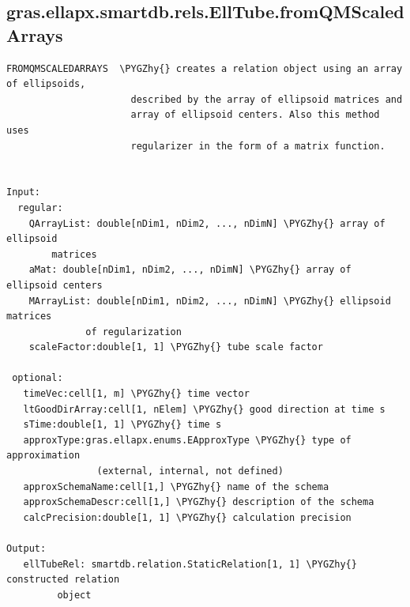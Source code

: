 \documentclass[letterpaper,10pt,english]{sphinxmanual}
\def\PYGZhy{\char`\-}
\begin{document}
\subsection{gras.ellapx.smartdb.rels.EllTube.fromQMScaledArrays}
\label{chap_functions:gras-ellapx-smartdb-rels-elltube-fromqmscaledarrays}
\begin{Verbatim}[commandchars=\\\{\}]
FROMQMSCALEDARRAYS  \PYGZhy{} creates a relation object using an array of ellipsoids,
                      described by the array of ellipsoid matrices and
                      array of ellipsoid centers. Also this method uses
                      regularizer in the form of a matrix function.


Input:
  regular:
    QArrayList: double[nDim1, nDim2, ..., nDimN] \PYGZhy{} array of ellipsoid
        matrices
    aMat: double[nDim1, nDim2, ..., nDimN] \PYGZhy{} array of ellipsoid centers
    MArrayList: double[nDim1, nDim2, ..., nDimN] \PYGZhy{} ellipsoid matrices
              of regularization
    scaleFactor:double[1, 1] \PYGZhy{} tube scale factor

 optional:
   timeVec:cell[1, m] \PYGZhy{} time vector
   ltGoodDirArray:cell[1, nElem] \PYGZhy{} good direction at time s
   sTime:double[1, 1] \PYGZhy{} time s
   approxType:gras.ellapx.enums.EApproxType \PYGZhy{} type of approximation
                (external, internal, not defined)
   approxSchemaName:cell[1,] \PYGZhy{} name of the schema
   approxSchemaDescr:cell[1,] \PYGZhy{} description of the schema
   calcPrecision:double[1, 1] \PYGZhy{} calculation precision

Output:
   ellTubeRel: smartdb.relation.StaticRelation[1, 1] \PYGZhy{} constructed relation
         object
\end{Verbatim}
\end{document}
